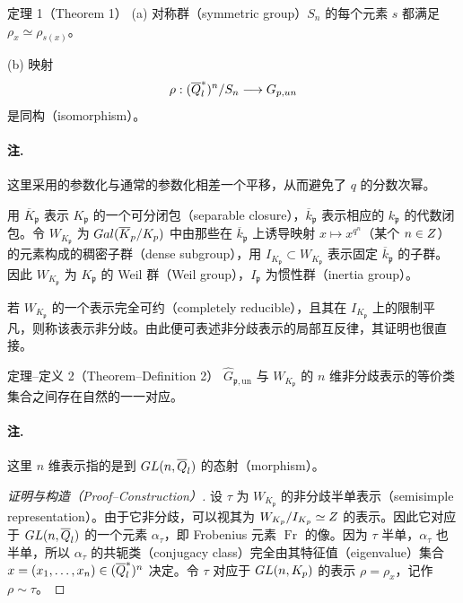 \begin{originaltheorem}{定理 1（Theorem 1）}
(a) 对称群（symmetric group）$S_n$ 的每个元素 $s$ 都满足 $\rho_x\simeq\rho_{s(x)}$。

(b) 映射
\[
 \rho:(\overline{Q}_l^*)^n/S_n\longrightarrow G_{p,un}
\]
是同构（isomorphism）。
\end{originaltheorem}

\paragraph*{注.} 这里采用的参数化与通常的参数化相差一个平移，从而避免了 $q$ 的分数次幂。

用 $\overline K_{\mathfrak p}$ 表示 $K_{\mathfrak p}$ 的一个可分闭包（separable closure），$\overline k_{\mathfrak p}$ 表示相应的 $k_{\mathfrak p}$ 的代数闭包。令 $W_{K_{\mathfrak p}}$ 为 $Gal(\overline K_{p}/K_{p})$ 中由那些在 $\overline k_{\mathfrak p}$ 上诱导映射 $x\mapsto x^{q^n}$（某个 $n\in Z$）的元素构成的稠密子群（dense subgroup），用 $I_{K_{\mathfrak p}}\subset W_{K_{\mathfrak p}}$ 表示固定 $\overline k_{\mathfrak p}$ 的子群。因此 $W_{K_{\mathfrak p}}$ 为 $K_{\mathfrak p}$ 的 Weil 群（Weil group），$I_{\mathfrak p}$ 为惯性群（inertia group）。

若 $W_{K_{\mathfrak p}}$ 的一个表示完全可约（completely reducible），且其在 $I_{K_{\mathfrak p}}$ 上的限制平凡，则称该表示非分歧。由此便可表述非分歧表示的局部互反律，其证明也很直接。

\begin{originaltheorem}{定理--定义 2（Theorem--Definition 2）}
$\widehat G_{\mathfrak p,\mathrm{un}}$ 与 $W_{K_{\mathfrak p}}$ 的 $n$ 维非分歧表示的等价类集合之间存在自然的一一对应。
\end{originaltheorem}
\paragraph*{注.} 这里 $n$ 维表示指的是到 $GL(n,\overline{Q}_l)$ 的态射（morphism）。
\begin{proof}[证明与构造（Proof--Construction）]
设 $\tau$ 为 $W_{K_{\mathfrak p}}$ 的非分歧半单表示（semisimple representation）。由于它非分歧，可以视其为
$W_{K_{p}}/I_{K_{p}}\simeq Z$ 的表示。因此它对应于 $GL(n,\overline{Q}_l)$ 的一个元素 $\alpha_\tau$，即 Frobenius 元素 $\operatorname{Fr}$ 的像。因为 $\tau$ 半单，$\alpha_\tau$ 也半单，所以 $\alpha_\tau$ 的共轭类（conjugacy class）完全由其特征值（eigenvalue）集合 $x=(x_1,\ldots,x_n)\in(\overline{Q}_l^*)^n$ 决定。令 $\tau$ 对应于 $GL(n,K_{p})$ 的表示 $\rho=\rho_x$，记作 $\rho\sim\tau$。
\end{proof}

